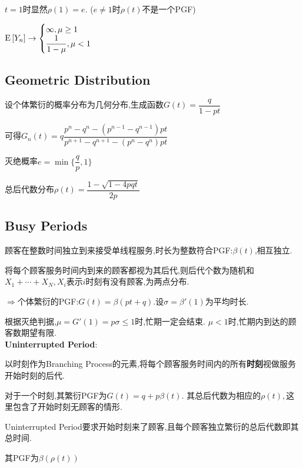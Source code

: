 $ t = 1时显然\rho(1) = e.$ ($ e \ne 1$时$ \rho(t)$不是一个PGF)

$\text{E}\left[Y_n\right] \to \begin{cases}\infty, \mu \ge  1\\\dfrac{1}{1-\mu}, \mu < 1\end{cases} $

\subsection{Geometric Distribution}
设个体繁衍的概率分布为几何分布,生成函数$ G(t) = \dfrac{q}{1-pt}$

可得$ G_n(t) = q\dfrac{p^n-q^n - (p^{n-1}-q^{n-1})pt}{p^{n+1}-q^{n+1}-(p^n-q^n)pt}$

灭绝概率$ e = \min\{\dfrac{q}{p},1\}$

总后代数分布$ \rho(t) = \dfrac{1-\sqrt{1-4pqt}}{2p}$

\subsection{Busy Periods}
顾客在整数时间独立到来接受单线程服务,时长为整数符合PGF:$ \beta(t)$,相互独立.

将每个顾客服务时间内到来的顾客都视为其后代,则后代个数为随机和$ X_1 + \cdots +X_N, X_i $表示$ i$时刻有没有顾客,为两点分布.

$ \Rightarrow $个体繁衍的PGF:$ G(t)= \beta(pt + q). $设$ \sigma = \beta'(1)$为平均时长.

根据灭绝判据,$ \mu = G'(1) = p\sigma \le 1$时,忙期一定会结束. $ \mu < 1$时,忙期内到达的顾客数期望有限.
\\

\textbf{Uninterrupted Period}:

以时刻作为Branching Process的元素,将每个顾客服务时间内的所有\textbf{时刻}视做服务开始时刻的后代.

对于一个时刻,其繁衍PGF为$ G(t) = q + p\beta(t)$. 其总后代数为相应的$ \rho(t),$这里包含了开始时刻无顾客的情形.

Uninterrupted Period要求开始时刻来了顾客,且每个顾客独立繁衍的总后代数即其总时间.

其PGF为$ \beta(\rho(t))$
